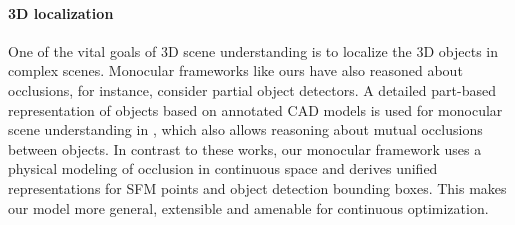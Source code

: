 

\vspace{-0.3cm}
\paragraph{3D localization}
One of the vital goals of 3D scene understanding is to localize the 3D objects in complex scenes. 
Monocular frameworks like ours have also reasoned about occlusions, for instance, \cite{Wojek_etal_2013} consider partial object detectors. A detailed part-based representation of objects based on annotated CAD models is used for monocular scene understanding in \cite{Zia_etal_2013,Zia_etal_2014}, which also allows reasoning about mutual occlusions between objects. In contrast to these works, our monocular framework uses a physical modeling of occlusion in continuous space and derives unified representations for SFM points and object detection bounding boxes. This makes our model more general, extensible and amenable for continuous optimization.


